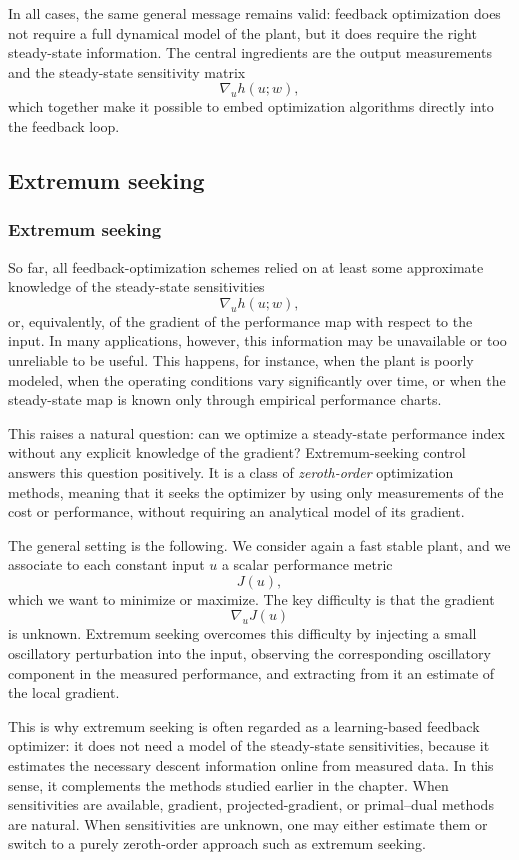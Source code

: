 In all cases, the same general message remains valid: feedback optimization does not require a full dynamical model of the plant, but it does require the right steady-state information. The central ingredients are the output measurements and the steady-state sensitivity matrix
\[
\nabla_u h(u;w),
\]
which together make it possible to embed optimization algorithms directly into the feedback loop.

\subsection{Extremum seeking}
\subsubsection{Extremum seeking}
So far, all feedback-optimization schemes relied on at least some approximate knowledge of the steady-state sensitivities
\[
\nabla_u h(u;w),
\]
or, equivalently, of the gradient of the performance map with respect to the input. In many applications, however, this information may be unavailable or too unreliable to be useful. This happens, for instance, when the plant is poorly modeled, when the operating conditions vary significantly over time, or when the steady-state map is known only through empirical performance charts.

This raises a natural question: can we optimize a steady-state performance index without any explicit knowledge of the gradient? Extremum-seeking control answers this question positively. It is a class of \emph{zeroth-order} optimization methods, meaning that it seeks the optimizer by using only measurements of the cost or performance, without requiring an analytical model of its gradient.

The general setting is the following. We consider again a fast stable plant, and we associate to each constant input $u$ a scalar performance metric
\[
J(u),
\]
which we want to minimize or maximize. The key difficulty is that the gradient
\[
\nabla_u J(u)
\]
is unknown. Extremum seeking overcomes this difficulty by injecting a small oscillatory perturbation into the input, observing the corresponding oscillatory component in the measured performance, and extracting from it an estimate of the local gradient.

This is why extremum seeking is often regarded as a learning-based feedback optimizer: it does not need a model of the steady-state sensitivities, because it estimates the necessary descent information online from measured data. In this sense, it complements the methods studied earlier in the chapter. When sensitivities are available, gradient, projected-gradient, or primal--dual methods are natural. When sensitivities are unknown, one may either estimate them or switch to a purely zeroth-order approach such as extremum seeking.

